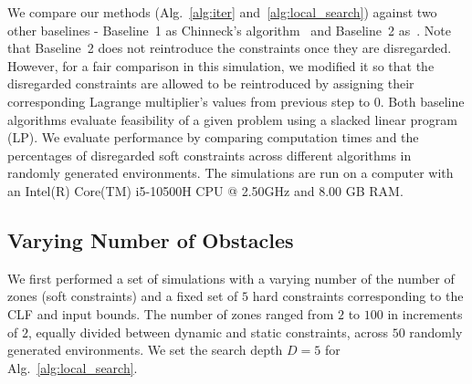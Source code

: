 \documentclass[letterpaper, 10 pt, conference]{ieeeconf}  %
\begin{document}
We compare our methods (Alg.~\ref{alg:iter} and~\ref{alg:local_search}) against two other baselines - Baseline~1 as Chinneck's algorithm~\cite[Algorithm~1]{chinneck} and Baseline~2 as~\cite[Algorithm~2]{hardik2024}. Note that Baseline~2 does not reintroduce the constraints once they are disregarded. However, for a fair comparison in this simulation, we modified it so that the disregarded constraints are allowed to be reintroduced by assigning their corresponding Lagrange multiplier's values from previous step to $0$. Both baseline algorithms evaluate feasibility of a given problem using a slacked linear program (LP). We evaluate performance by comparing computation times and the percentages of disregarded soft constraints across different algorithms in randomly generated environments. The simulations are run on a computer with an Intel(R) Core(TM) i5-10500H CPU @ 2.50GHz and 8.00 GB RAM.



\subsection{Varying Number of Obstacles}

We first performed a set of simulations with a varying number of the number of zones (soft constraints) and a fixed set of $5$ hard constraints corresponding to the CLF and input bounds. The number of zones ranged from $2$ to $100$ in increments of $2$, equally divided between dynamic and static constraints, across $50$ randomly generated environments. We set the search depth $D=5$ for Alg.~\ref{alg:local_search}. 
\end{document}
